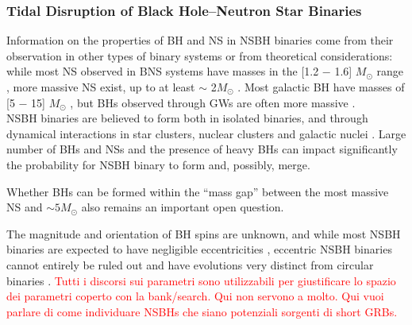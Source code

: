\documentclass[binding=0.6cm, LaM]{sapthesis}
\newcommand{\fpg}[1]{\textcolor{red}{#1} }
\begin{document}
\subsubsection{Tidal Disruption of Black Hole--Neutron Star Binaries}
        Information on the properties of BH and NS in NSBH binaries come from
        their observation in other types of binary systems or from theoretical considerations:
        while most NS observed in BNS systems have masses in the [1.2 − 1.6] $M_{\odot}$ range \cite{200},
        more massive NS exist, up to at least $\sim$ 2$M_{\odot}$  \cite{200}.
        Most galactic BH have masses of [5 − 15] $M_{\odot}$  \cite{195},
        but BHs observed through GWs are often more massive \cite{13}. \\
        NSBH binaries are believed to form both in isolated binaries,
        and through dynamical interactions in star clusters, nuclear clusters and galactic nuclei \cite{194}.
        Large number of BHs and NSs and the presence of heavy BHs can impact significantly
        the probability for NSBH binary to form and, possibly, merge.

        Whether BHs can be formed within the ``mass gap'' between the most massive NS
        and $\sim 5M_{\odot}$ also remains an important open question.

        The magnitude and orientation of BH spins are unknown, and while most NSBH binaries
        are expected to have negligible eccentricities \cite{202},
        eccentric NSBH binaries cannot entirely be ruled out
        and have evolutions very distinct from circular binaries \cite{203}.
        \fpg{Tutti i discorsi sui parametri sono utilizzabili per giustificare lo spazio dei parametri coperto con la bank/search.  Qui non servono a molto.  Qui vuoi parlare di come individuare NSBHs che siano potenziali sorgenti di short GRBs.}
\end{document}

